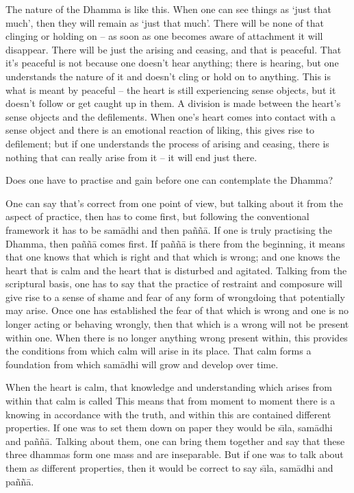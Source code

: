 The nature of the Dhamma is like this. When one can see things as `just that much', then they will remain as `just that much'. There will be none of that clinging or holding on -- as soon as one becomes aware of attachment it will disappear. There will be just the arising and ceasing, and that is peaceful. That it's peaceful is not because one doesn't hear anything; there is hearing, but one understands the nature of it and doesn't cling or hold on to anything. This is what is meant by peaceful -- the heart is still experiencing sense objects, but it doesn't follow or get caught up in them. A division is made between the heart's sense objects and the defilements. When one's heart comes into contact with a sense object and there is an emotional reaction of liking, this gives rise to defilement; but if one understands the process of arising and ceasing, there is nothing that can really arise from it -- it will end just there.

 Does one have to practise and gain  before one can contemplate the Dhamma?

 One can say that's correct from one point of view, but talking about it from the aspect of practice, then  has to come first, but following the conventional framework it has to be  sam\=adhi and then pa\~n\~n\=a. If one is truly practising the Dhamma, then pa\~n\~n\=a comes first. If pa\~n\~n\=a is there from the beginning, it means that one knows that which is right and that which is wrong; and one knows the heart that is calm and the heart that is disturbed and agitated. Talking from the scriptural basis, one has to say that the practice of restraint and composure will give rise to a sense of shame and fear of any form of wrongdoing that potentially may arise. Once one has established the fear of that which is wrong and one is no longer acting or behaving wrongly, then that which is a wrong will not be present within one. When there is no longer anything wrong present within, this provides the conditions from which calm will arise in its place. That calm forms a foundation from which sam\=adhi will grow and develop over time.

When the heart is calm, that knowledge and understanding which arises from within that calm is called  This means that from moment to moment there is a knowing in accordance with the truth, and within this are contained different properties. If one was to set them down on paper they would be s\={\i}la, sam\=adhi and pa\~n\~n\=a. Talking about them, one can bring them together and say that these three dhammas form one mass and are inseparable. But if one was to talk about them as different properties, then it would be correct to say s\={\i}la, sam\=adhi and pa\~n\~n\=a.


